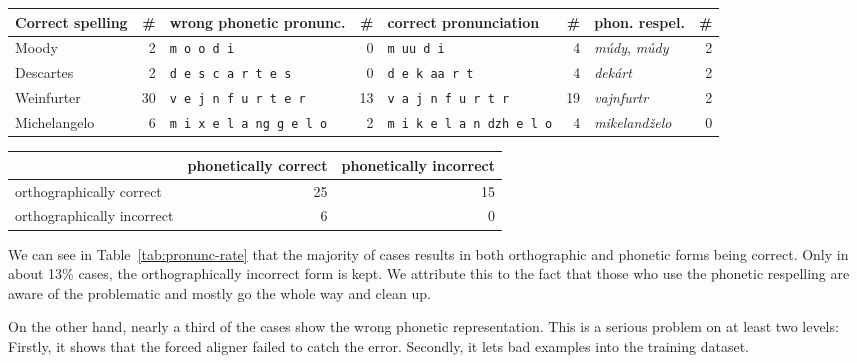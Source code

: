 \documentclass{itatnew}
\begin{document}
\begin{table*}[htpb]
\begin{center}
\begin{tabular}{|l r|l r|l r|l r|}
\hline
Correct spelling            & \#
	& wrong phonetic pronunc.   & \#
		& correct pronunciation     & \#
			& phon. respel.             & \# \\
\hline
Moody & 2 & \texttt{m o o d i} & 0 & \texttt{m uu d i} & 4 & {\em múdy}, {\em můdy} & 2 \\
Descartes & 2 & \texttt{d e s c a r t e s} & 0 & \texttt{d e k aa r t} & 4 & {\em dekárt} & 2   \\
Weinfurter & 30 & \texttt{v e j n f u r t e r} & 13 & \texttt{v a j n f u r t r} & 19 & {\em vajnfurtr} & 2 \\
Michelangelo & 6 & \texttt{m i x e l a ng g e l o} & 2 & \texttt{m i k e l a n dzh e l o} & 4 & {\em mikelandželo} & 0 \\
\hline
\end{tabular}
\caption{Examples of non-standard pronunciation in the manually transcribed data}
\label{tab:pronunc}
\end{center}
\end{table*}

\begin{table*}[htpb]
\begin{center}
\begin{tabular}{|l|r|r|}
\hline
 & phonetically correct & phonetically incorrect \\
\hline
orthographically correct & 25 & 15 \\
\hline
orthographically incorrect & 6 & 0 \\
\hline
\end{tabular}
\caption{Success rate for phonetic and orthographic representation of foreign
words based on data from table\ref{tab:pronunc}}
\label{tab:pronunc-rate}
\end{center}
\end{table*}

We can see in Table~\ref{tab:pronunc-rate} that the majority of cases results in
both orthographic and phonetic forms being correct. Only in about 13\% cases,
the orthographically incorrect form is kept. We attribute this to the fact that
those who use the phonetic respelling are aware of the problematic and mostly
go the whole way and clean up.

On the other hand, nearly a third of the cases show the wrong phonetic
representation. This is a serious problem on at least two levels: Firstly, it
shows that the forced aligner failed to catch the error. Secondly, it lets bad
examples into the training dataset.
\end{document}
